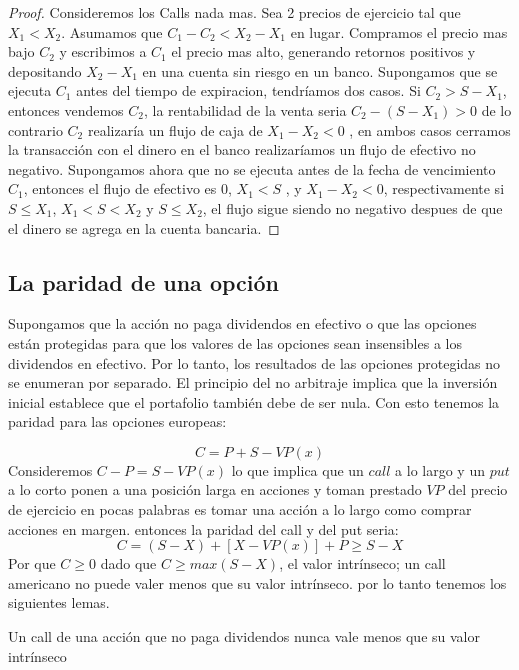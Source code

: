 \begin{defn}
								\begin{proof} 
									Consideremos los Calls nada mas. Sea 2 precios de ejercicio tal que $ X_{1}<X_{2} $. Asumamos que $ C_{1} - C_{2}<X_{2}-X_{1} $ en lugar. Compramos el precio mas bajo $ C_{2} $ y escribimos a $ C_{1} $ el precio mas alto, generando retornos positivos y depositando $ X_{2}-X_{1} $ en una cuenta sin riesgo en un banco.
									  \newline
									  Supongamos que se ejecuta $ C_{1} $ antes del tiempo de expiracion, tendríamos dos casos. Si $ C_{2} >S-X_{1}$, entonces vendemos $ C_{2} $, la rentabilidad de la venta seria $ C_{2}-(S-X_{1})>0 $ de lo contrario $ C_{2} $ realizaría un flujo de caja de $ X_{1}-X_{2} < 0  $ , en ambos casos cerramos la transacción con el dinero en el banco realizaríamos un flujo de efectivo no negativo. \newline
									  Supongamos ahora que no se ejecuta antes de la fecha de vencimiento $ C_{1} $, entonces el flujo de efectivo es 0, $ X_{1}<S $ , y $ X_{1}-X_{2} < 0 $, respectivamente si $ S \leq X_{1} $, $ X_{1}<S<X_{2} $ y $ S\leq X_{2} $, el flujo sigue siendo no negativo despues de que el dinero se agrega en la cuenta bancaria. 
									   
								\end{proof}
								\subsection	{La paridad de una opción }
							Supongamos que la acción no paga dividendos en efectivo o que las opciones están protegidas para que los valores de las opciones sean insensibles a los dividendos en efectivo. Por lo tanto, los resultados de las opciones protegidas no se enumeran por separado.	\newline
							El principio del no arbitraje implica que la inversión inicial establece que el portafolio también debe de ser nula. Con esto tenemos la paridad para las opciones europeas:
							
							\begin{equation}\label{eq0}
							C=P+S-VP(x)
							\end{equation}
							Consideremos $ C-P= S-VP(x) $ lo que implica que un $ call  $ a lo largo y un $ put $ a lo corto ponen a una posición larga en acciones y toman prestado $ VP $ del precio de ejercicio en pocas palabras es tomar una acción a lo largo como comprar acciones en margen. entonces la paridad del call y del put seria:
								\begin{equation}\label{eq0}
								C=(S-X) + [X-VP(x)]+P \geq S-X
								\end{equation}
								Por que $ C\geq 0 $ dado que $ C\geq max (S-X) $, el valor intrínseco; un call americano no puede valer menos que su valor intrínseco. por lo tanto tenemos los siguientes lemas. 
								\begin{lem}\label{lmcp11}
									Un call de una acción que no paga dividendos nunca vale menos que su valor intrínseco 
									

\end{lem}
\end{defn}
